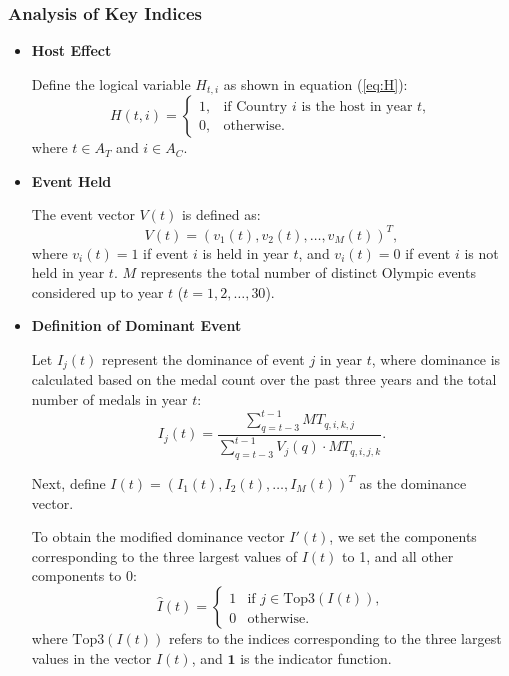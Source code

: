 \documentclass{mcmthesis}
\begin{document}
\subsubsection{Analysis of Key Indices}
\begin{itemize}[leftmargin=0.15in, labelsep=0.1in, itemsep=1pt, parsep=0pt]
	\item \textbf{Host Effect}
	
	Define the logical variable \( H_{t,i} \) as shown in equation (\ref{eq:H}):
	\begin{equation*}
		H(t,i) = 
		\begin{cases} 
			1, & \text{if Country } i \text{ is the host in year } t, \\
			0, & \text{otherwise.}
		\end{cases}
		\label{eq:H}
	\end{equation*}
	where \( t \in A_{T} \) and \( i \in A_{C} \).
	
	\item \textbf{Event Held}
	
	The event vector \( V(t) \) is defined as:
	\[
	V(t) = \left( v_1(t), v_2(t), \dots, v_M(t) \right)^T,
	\]
	where \( v_i(t) = 1 \) if event \( i \) is held in year \( t \), and \( v_i(t) = 0 \) if event \( i \) is not held in year \( t \). \( M \) represents the total number of distinct Olympic events considered up to year \( t \) (\( t = 1, 2, \dots, 30 \)).
	
	\item \textbf{Definition of Dominant Event}
	
	Let \( I_j(t) \) represent the dominance of event \( j \) in year \( t \), where dominance is calculated based on the medal count over the past three years and the total number of medals in year \( t \):
	\[
	I_j(t) = \frac{\sum_{q=t-3}^{t-1} MT_{q,i,k,j}}{\sum_{q=t-3}^{t-1} V_j(q) \cdot MT_{q,i,j,k}}.
	\]
	
	Next, define \( I(t) = \left( I_1(t), I_2(t), \dots, I_M(t) \right)^T \) as the dominance vector.
	
	To obtain the modified dominance vector \( I'(t) \), we set the components corresponding to the three largest values of \( I(t) \) to 1, and all other components to 0:
	\[
	\hat{I}(t) = 
	\begin{cases} 
		1 & \text{if } j \in \text{Top3}(I(t)), \\
		0 & \text{otherwise.}
	\end{cases}
	\]
	where \( \text{Top3}(I(t)) \) refers to the indices corresponding to the three largest values in the vector \( I(t) \), and \( \mathbf{1} \) is the indicator function.
	

\end{itemize}
\end{document}
